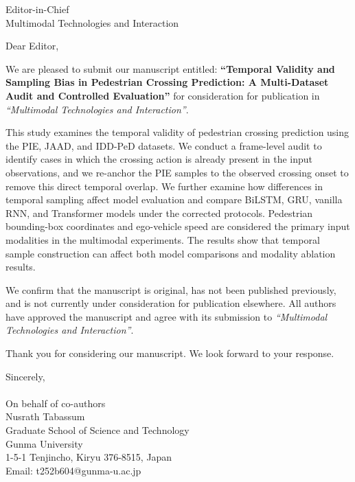 \documentclass[11pt]{letter}
\begin{document}
\begin{letter}{
Editor-in-Chief \\
Multimodal Technologies and Interaction \\
}

\date{\today}

\opening{Dear Editor,}

We are pleased to submit our manuscript entitled: \textbf{``Temporal Validity and Sampling Bias in Pedestrian Crossing Prediction: A Multi-Dataset Audit and Controlled Evaluation''} for consideration for publication in \textit{``Multimodal Technologies and Interaction''}.

This study examines the temporal validity of pedestrian crossing prediction using the PIE, JAAD, and IDD-PeD datasets. We conduct a frame-level audit to identify cases in which the crossing action is already present in the input observations, and we re-anchor the PIE samples to the observed crossing onset to remove this direct temporal overlap. We further examine how differences in temporal sampling affect model evaluation and compare BiLSTM, GRU, vanilla RNN, and Transformer models under the corrected protocols. Pedestrian bounding-box coordinates and ego-vehicle speed are considered the primary input modalities in the multimodal experiments. The results show that temporal sample construction can affect both model comparisons and modality ablation results.

We confirm that the manuscript is original, has not been published previously, and is not currently under consideration for publication elsewhere. All authors have approved the manuscript and agree with its submission to \textit{``Multimodal Technologies and Interaction''}.


Thank you for considering our manuscript. We look forward to your response.




Sincerely, \\ \\
On behalf of co-authors\\
Nusrath Tabassum \\
Graduate School of Science and Technology \\
Gunma University \\
1-5-1 Tenjincho, Kiryu 376-8515, Japan \\
Email: t252b604@gunma-u.ac.jp \\

\end{letter}
\end{document}
